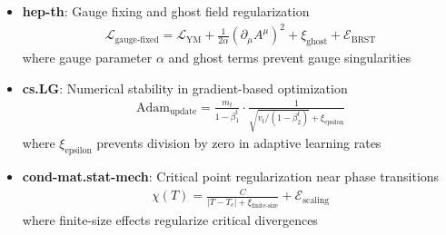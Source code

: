 \begin{theorem}
\begin{itemize}
\item \textbf{hep-th}: Gauge fixing and ghost field regularization
  \begin{align}
  \mathcal{L}_{\text{gauge-fixed}} = \mathcal{L}_{\text{YM}} + \frac{1}{2\alpha}(\partial_\mu A^\mu)^2 + \xi_{\text{ghost}} + \mathcal{E}_{\text{BRST}}
  \end{align}
  where gauge parameter $\alpha$ and ghost terms prevent gauge singularities
  
\item \textbf{cs.LG}: Numerical stability in gradient-based optimization
  \begin{align}
  \text{Adam}_{\text{update}} = \frac{m_t}{1 - \beta_1^t} \cdot \frac{1}{\sqrt{v_t/(1 - \beta_2^t)} + \xi_{\text{epsilon}}}
  \end{align}
  where $\xi_{\text{epsilon}}$ prevents division by zero in adaptive learning rates
  
\item \textbf{cond-mat.stat-mech}: Critical point regularization near phase transitions
  \begin{align}
  \chi(T) = \frac{C}{|T - T_c| + \xi_{\text{finite-size}}} + \mathcal{E}_{\text{scaling}}
  \end{align}
  where finite-size effects regularize critical divergences
\end{itemize}
\end{theorem}

